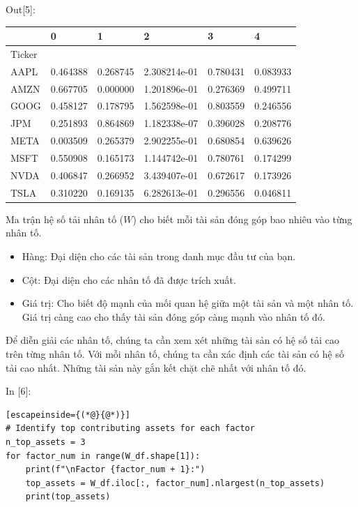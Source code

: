 Out{[}5{]}:

{\small
\begin{longtable}[]{@{}llllll@{}}
\toprule\noalign{}
& 0 & 1 & 2 & 3 & 4 \\
\midrule\noalign{}
\endhead
\bottomrule\noalign{}
\endlastfoot
Ticker & & & & & \\
AAPL & 0.464388 & 0.268745 & 2.308214e-01 & 0.780431 & 0.083933 \\
AMZN & 0.667705 & 0.000000 & 1.201896e-01 & 0.276369 & 0.499711 \\
GOOG & 0.458127 & 0.178795 & 1.562598e-01 & 0.803559 & 0.246556 \\
JPM & 0.251893 & 0.864869 & 1.182338e-07 & 0.396028 & 0.208776 \\
META & 0.003509 & 0.265379 & 2.902255e-01 & 0.680854 & 0.639626 \\
MSFT & 0.550908 & 0.165173 & 1.144742e-01 & 0.780761 & 0.174299 \\
NVDA & 0.406847 & 0.266952 & 3.439407e-01 & 0.672617 & 0.173926 \\
TSLA & 0.310220 & 0.169135 & 6.282613e-01 & 0.296556 & 0.046811 \\
\end{longtable}
}

Ma trận hệ số tải nhân tố (\(W\)) cho biết mỗi tài sản đóng góp bao nhiêu vào từng nhân tố.

\begin{itemize}
\item
  Hàng: Đại diện cho các tài sản trong danh mục đầu tư của bạn.
\item
  Cột: Đại diện cho các nhân tố đã được trích xuất.
\item
  Giá trị: Cho biết độ mạnh của mối quan hệ giữa một tài sản và một nhân tố. Giá trị càng cao cho thấy tài sản đóng góp càng mạnh vào nhân tố đó.
\end{itemize}

Để diễn giải các nhân tố, chúng ta cần xem xét những tài sản có hệ số tải cao trên từng nhân tố. Với mỗi nhân tố, chúng ta cần xác định các tài sản có hệ số tải cao nhất. Những tài sản này gắn kết chặt chẽ nhất với nhân tố đó.

In {[}6{]}:

\begin{lstlisting}[escapeinside={(*@}{@*)}]
# Identify top contributing assets for each factor
n_top_assets = 3
for factor_num in range(W_df.shape[1]):
    print(f"\nFactor {factor_num + 1}:")
    top_assets = W_df.iloc[:, factor_num].nlargest(n_top_assets)
    print(top_assets)
\end{lstlisting}

